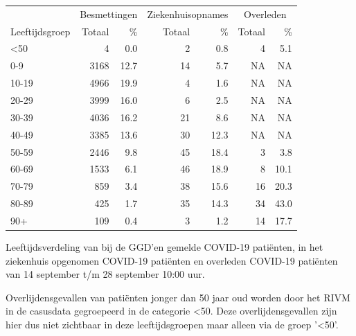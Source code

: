 \documentclass[
  english,
  man,floatsintext]{apa6}
\begin{document}
\begin{table}
\centering\begingroup\fontsize{11}{13}\selectfont

\begin{threeparttable}
\begin{tabular}{lrrrrrr}
\toprule
\multicolumn{1}{c}{ } & \multicolumn{2}{c}{Besmettingen} & \multicolumn{2}{c}{Ziekenhuisopnames} & \multicolumn{2}{c}{Overleden} \\
\cmidrule(l{3pt}r{3pt}){2-3} \cmidrule(l{3pt}r{3pt}){4-5} \cmidrule(l{3pt}r{3pt}){6-7}
Leeftijdsgroep & Totaal & \% & Totaal & \% & Totaal & \%\\
\midrule
<50 & 4 & 0.0 & 2 & 0.8 & 4 & 5.1\\
0-9 & 3168 & 12.7 & 14 & 5.7 & NA & NA\\
10-19 & 4966 & 19.9 & 4 & 1.6 & NA & NA\\
20-29 & 3999 & 16.0 & 6 & 2.5 & NA & NA\\
30-39 & 4036 & 16.2 & 21 & 8.6 & NA & NA\\
40-49 & 3385 & 13.6 & 30 & 12.3 & NA & NA\\
50-59 & 2446 & 9.8 & 45 & 18.4 & 3 & 3.8\\
60-69 & 1533 & 6.1 & 46 & 18.9 & 8 & 10.1\\
70-79 & 859 & 3.4 & 38 & 15.6 & 16 & 20.3\\
80-89 & 425 & 1.7 & 35 & 14.3 & 34 & 43.0\\
90+ & 109 & 0.4 & 3 & 1.2 & 14 & 17.7\\
\bottomrule
\end{tabular}
\begin{tablenotes}
\item[1] Leeftijdsverdeling van bij de GGD’en gemelde COVID-19 patiënten, in het ziekenhuis opgenomen COVID-19 patiënten en overleden COVID-19 patiënten van 14 september t/m 28 september 10:00 uur.
\item[2] Overlijdensgevallen van patiënten jonger dan 50 jaar oud worden door het RIVM in de casusdata gegroepeerd in de categorie <50. Deze overlijdensgevallen zijn hier dus niet zichtbaar in deze leeftijdsgroepen maar alleen via de groep '<50'.
\end{tablenotes}
\end{threeparttable}
\endgroup{}
\end{table}

\newpage
\end{document}
